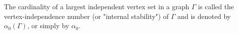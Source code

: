The cardinality of a largest independent vertex set in a graph $\Gamma$ is called the vertex-independence number (or "internal stability") of $\Gamma$ and is denoted by $\alpha_0(\Gamma)$, or simply by $\alpha_0$.